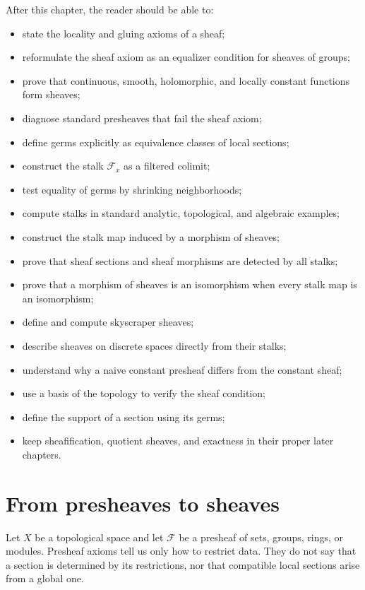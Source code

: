 After this chapter, the reader should be able to:
\begin{itemize}
\item state the locality and gluing axioms of a sheaf;
\item reformulate the sheaf axiom as an equalizer condition for sheaves of groups;
\item prove that continuous, smooth, holomorphic, and locally constant functions form sheaves;
\item diagnose standard presheaves that fail the sheaf axiom;
\item define germs explicitly as equivalence classes of local sections;
\item construct the stalk $\mathcal F_x$ as a filtered colimit;
\item test equality of germs by shrinking neighborhoods;
\item compute stalks in standard analytic, topological, and algebraic examples;
\item construct the stalk map induced by a morphism of sheaves;
\item prove that sheaf sections and sheaf morphisms are detected by all stalks;
\item prove that a morphism of sheaves is an isomorphism when every stalk map is an isomorphism;
\item define and compute skyscraper sheaves;
\item describe sheaves on discrete spaces directly from their stalks;
\item understand why a naive constant presheaf differs from the constant sheaf;
\item use a basis of the topology to verify the sheaf condition;
\item define the support of a section using its germs;
\item keep sheafification, quotient sheaves, and exactness in their proper later chapters.
\end{itemize}

\section{From presheaves to sheaves}

Let $X$ be a topological space and let $\mathcal F$ be a presheaf of sets, groups, rings,
or modules.  Presheaf axioms tell us only how to restrict data.  They do not say that a
section is determined by its restrictions, nor that compatible local sections arise from a
global one.

